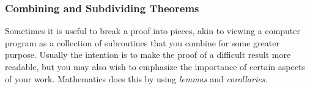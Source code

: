 



\subsubsection*{Combining and Subdividing Theorems}

Sometimes it is useful to break a proof into pieces, akin to viewing a computer program as a collection of subroutines that you combine for some greater purpose. Usually the intention is to make the proof of a difficult result more readable, but you may also wish to emphasize the importance of certain aspects of your work. Mathematics does this by using \emph{lemmas} and \emph{corollaries.}

